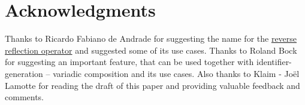 \section{Acknowledgments}

Thanks to Ricardo Fabiano de Andrade for suggesting the name \verb@unreflexpr@ for
the \hyperref[fut-reverse-reflection]{reverse reflection operator} and
suggested some of its use cases.
Thanks to Roland Bock for suggesting an important feature, that can be
used together with identifier-generation -- variadic composition and its use cases.
Also thanks to Klaim - Joël Lamotte for reading the draft of this paper and
providing valuable feedback and comments.
